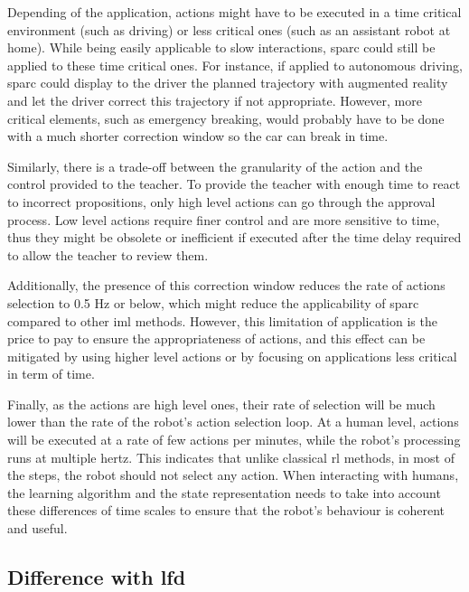 Depending of the application, actions might have to be executed in a time critical environment (such as driving) or less critical ones (such as an assistant robot at home). While being easily applicable to slow interactions, \gls{sparc} could still be applied to these time critical ones. For instance, if applied to autonomous driving, \gls{sparc} could display to the driver the planned trajectory with augmented reality and let the driver correct this trajectory if not appropriate. However, more critical elements, such as emergency breaking, would probably have to be done with a much shorter correction window so the car can break in time. 

Similarly, there is a trade-off between the granularity of the action and the control provided to the teacher. To provide the teacher with enough time to react to incorrect propositions, only high level actions can go through the approval process. Low level actions require finer control and are more sensitive to time, thus they might be obsolete or inefficient if executed after the time delay required to allow the teacher to review them.

Additionally, the presence of this correction window reduces the rate of actions selection to 0.5 Hz or below, which might reduce the applicability of \gls{sparc} compared to other \gls{iml} methods. However, this limitation of application is the price to pay to ensure the appropriateness of actions, and this effect can be mitigated by using higher level actions or by focusing on applications less critical in term of time. 

Finally, as the actions are high level ones, their rate of selection will be much lower than the rate of the robot's action selection loop. At a human level, actions will be executed at a rate of few actions per minutes, while the robot's processing runs at multiple hertz. This indicates that unlike classical \gls{rl} methods, in most of the steps, the robot should not select any action. When interacting with humans, the learning algorithm and the state representation needs to take into account these differences of time scales to ensure that the robot's behaviour is coherent and useful.

\subsection{Difference with \gls{lfd}}


